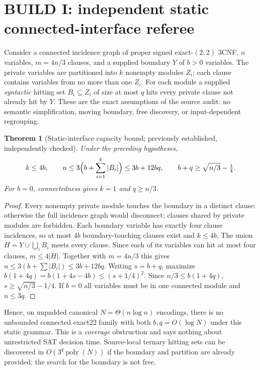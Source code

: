 \documentclass[11pt]{article}
\newtheorem{theorem}{Theorem}
\begin{document}
\section{BUILD I: independent static connected-interface referee}
Consider a connected incidence graph of proper signed exact-$(2,2)$ 3CNF, $n$ variables, $m=4n/3$ clauses, and a supplied boundary $Y$ of $b>0$ variables. The private variables are partitioned into $k$ nonempty modules $Z_i$; each clause contains variables from no more than one $Z_i$. For each module a supplied \emph{syntactic} hitting set $B_i\subseteq Z_i$ of size at most $q$ hits every private clause not already hit by $Y$. These are the exact assumptions of the source audit: no semantic simplification, moving boundary, free discovery, or input-dependent regrouping.
\begin{theorem}[Static-interface capacity bound; previously established, independently checked]
Under the preceding hypotheses,
\[
 k\le4b,\qquad n\le3\Bigl(b+\sum_{i=1}^k|B_i|\Bigr)\le3b+12bq,
 \qquad b+q\ge\sqrt{n/3}-\tfrac14.
\]
For $b=0$, connectedness gives $k=1$ and $q\ge n/3$.
\end{theorem}
\begin{proof}
Every nonempty private module touches the boundary in a distinct clause: otherwise the full incidence graph would disconnect; clauses shared by private modules are forbidden. Each boundary variable has exactly four clause incidences, so at most $4b$ boundary-touching clauses exist and $k\le4b$. The union $H=Y\cup\bigcup_i B_i$ meets every clause. Since each of its variables can hit at most four clauses, $m\le4|H|$. Together with $m=4n/3$ this gives $n\le3(b+\sum|B_i|)\le3b+12bq$. Writing $s=b+q$, maximize $b(1+4q)=b(1+4s-4b)\le(s+1/4)^2$. Since $n/3\le b(1+4q)$, $s\ge\sqrt{n/3}-1/4$. If $b=0$ all variables must be in one connected module and $n\le3q$.
\end{proof}
Hence, on unpadded canonical $N=\Theta(n\log n)$ encodings, there is no unbounded connected exact22 family with both $b,q=O(\log N)$ under this static grammar. This is a \emph{coverage} obstruction and says nothing about unrestricted SAT decision time. Source-local ternary hitting sets can be discovered in $O(3^q\operatorname{poly}(N))$ if the boundary and partition are already provided; the search for the boundary is not free.
\end{document}
